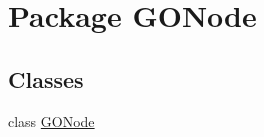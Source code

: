 \hypertarget{namespace_g_o_node}{
\section{Package GONode}
\label{namespace_g_o_node}
}
\subsection*{Classes}
\begin{DoxyCompactItemize}
\item 
class \hyperlink{class_g_o_node_1_1_g_o_node}{GONode}
\end{DoxyCompactItemize}
